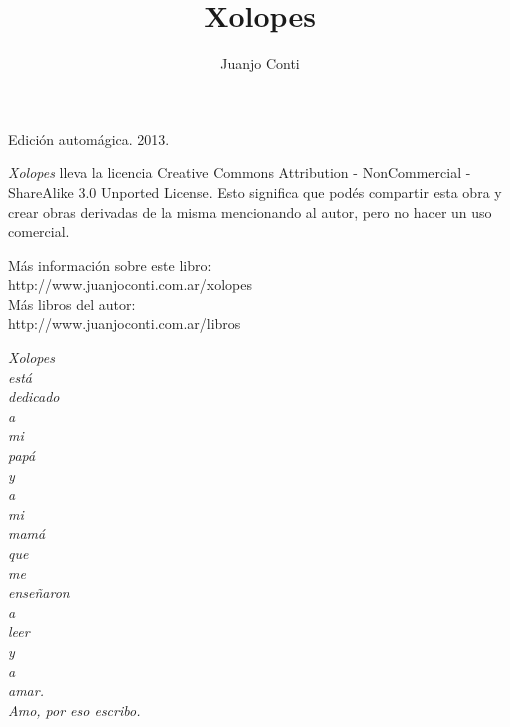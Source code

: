 \documentclass[12pt,twoside,openright,a5paper]{book}
\title{Xolopes}
\author{Juanjo Conti}
\date{}
\begin{document}
\pagestyle{plain}

\maketitle

\cleardoublepage

\thispagestyle{empty}
\noindent
Edición automágica. 2013.\\

\vspace{0.5cm}

\noindent
\emph{Xolopes} lleva la licencia 
Creative Commons Attribution - NonCommercial - ShareAlike 3.0 Unported License.
Esto significa que podés compartir esta obra y crear obras derivadas de la misma
mencionando al autor, pero no ha\-cer un uso comercial.

\vfill

\noindent
Más información sobre este libro:\\
http://www.juanjoconti.com.ar/xolopes\\

\noindent
Más libros del autor:\\
http://www.juanjoconti.com.ar/libros

\cleardoublepage

\noindent
\begin{flushright}
\emph{
\emph{Xolopes} \\está \\dedicado \\a \\mi \\papá \\y \\a \\mi \\mamá\\
que \\me \\enseñaron \\a \\leer \\y \\a \\amar.\\
\vspace{0.5cm}
Amo, por eso escribo.
}

\end{flushright}

\cleardoublepage


\hrulefill\hspace{0.2cm} \decofourleft\decofourright \hspace{0.2cm} \hrulefill
\vspace{0.5cm}
\end{document}
